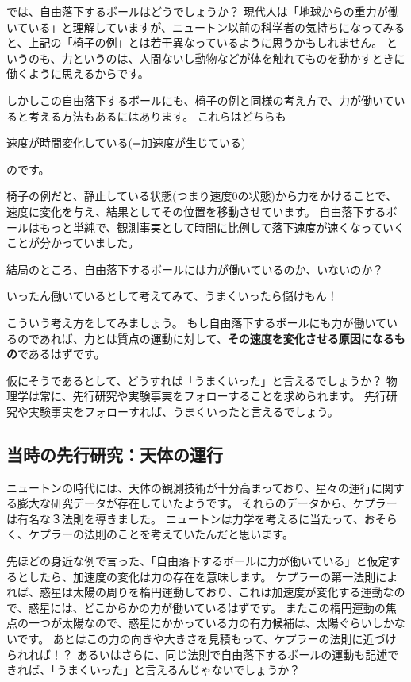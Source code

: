 では、自由落下するボールはどうでしょうか？
現代人は「地球からの重力が働いている」と理解していますが、ニュートン以前の科学者の気持ちになってみると、上記の「椅子の例」とは若干異なっているように思うかもしれません。
というのも、力というのは、人間ないし動物などが体を触れてものを動かすときに働くように思えるからです。

しかしこの自由落下するボールにも、椅子の例と同様の考え方で、力が働いていると考える方法もあるにはあります。
これらはどちらも
\begin{center}
  速度が時間変化している(=加速度が生じている)
\end{center}
のです。

椅子の例だと、静止している状態(つまり速度0の状態)から力をかけることで、速度に変化を与え、結果としてその位置を移動させています。
自由落下するボールはもっと単純で、観測事実として時間に比例して落下速度が速くなっていくことが分かっていました。

結局のところ、自由落下するボールには力が働いているのか、いないのか？
\begin{center}
  いったん働いているとして考えてみて、うまくいったら儲けもん！
\end{center}
こういう考え方をしてみましょう。
もし自由落下するボールにも力が働いているのであれば、力とは質点の運動に対して、\textbf{その速度を変化させる原因になるもの}であるはずです。

仮にそうであるとして、どうすれば「うまくいった」と言えるでしょうか？
物理学は常に、先行研究や実験事実をフォローすることを求められます。
先行研究や実験事実をフォローすれば、うまくいったと言えるでしょう。

\subsection{当時の先行研究：天体の運行}

ニュートンの時代には、天体の観測技術が十分高まっており、星々の運行に関する膨大な研究データが存在していたようです。
それらのデータから、ケプラーは有名な３法則を導きました。
ニュートンは力学を考えるに当たって、おそらく、ケプラーの法則のことを考えていたんだと思います。

先ほどの身近な例で言った、「自由落下するボールに力が働いている」と仮定するとしたら、加速度の変化は力の存在を意味します。
ケプラーの第一法則によれば、惑星は太陽の周りを楕円運動しており、これは加速度が変化する運動なので、惑星には、どこからかの力が働いているはずです。
またこの楕円運動の焦点の一つが太陽なので、惑星にかかっている力の有力候補は、太陽ぐらいしかないです。
あとはこの力の向きや大きさを見積もって、ケプラーの法則に近づけられれば！？
あるいはさらに、同じ法則で自由落下するボールの運動も記述できれば、「うまくいった」と言えるんじゃないでしょうか？

